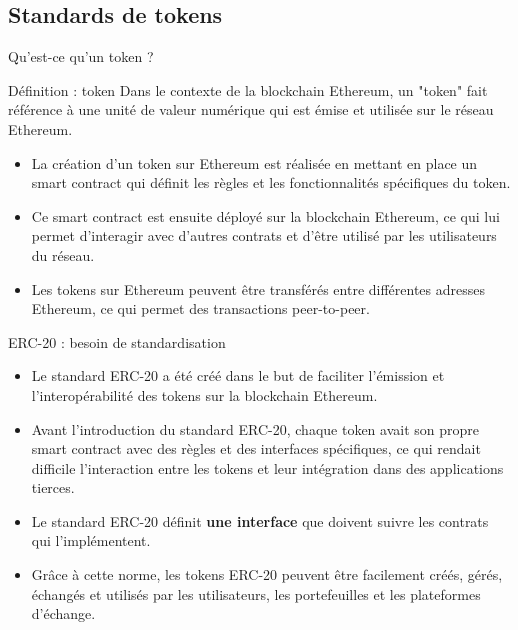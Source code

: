 \subsection{Standards de tokens}

\begin{frame}{Qu'est-ce qu'un token ?}
  \begin{block}{Définition : token}
    Dans le contexte de la blockchain Ethereum, un "token" fait référence à une unité de valeur numérique qui est émise et utilisée sur le réseau Ethereum.
  \end{block}

  \begin{itemize}
    \item La création d'un token sur Ethereum est réalisée en mettant en place un smart contract qui définit les règles et les fonctionnalités spécifiques du token.
    \item Ce smart contract est ensuite déployé sur la blockchain Ethereum, ce qui lui permet d'interagir avec d'autres contrats et d'être utilisé par les utilisateurs du réseau.
    \item Les tokens sur Ethereum peuvent être transférés entre différentes adresses Ethereum, ce qui permet des transactions peer-to-peer.
  \end{itemize}
\end{frame}

\begin{frame}{ERC-20 : besoin de standardisation}
  \begin{itemize}
    \item Le standard ERC-20 a été créé dans le but de faciliter l'émission et l'interopérabilité des tokens sur la blockchain Ethereum.
    \item Avant l'introduction du standard ERC-20, chaque token avait son propre smart contract avec des règles et des interfaces spécifiques, ce qui rendait difficile l'interaction entre les tokens et leur intégration dans des applications tierces.
    \item Le standard ERC-20 définit \textbf{une interface} que doivent suivre les contrats qui l'implémentent.
    \item Grâce à cette norme, les tokens ERC-20 peuvent être facilement créés, gérés, échangés et utilisés par les utilisateurs, les portefeuilles et les plateformes d'échange.
  \end{itemize}
\end{frame}

